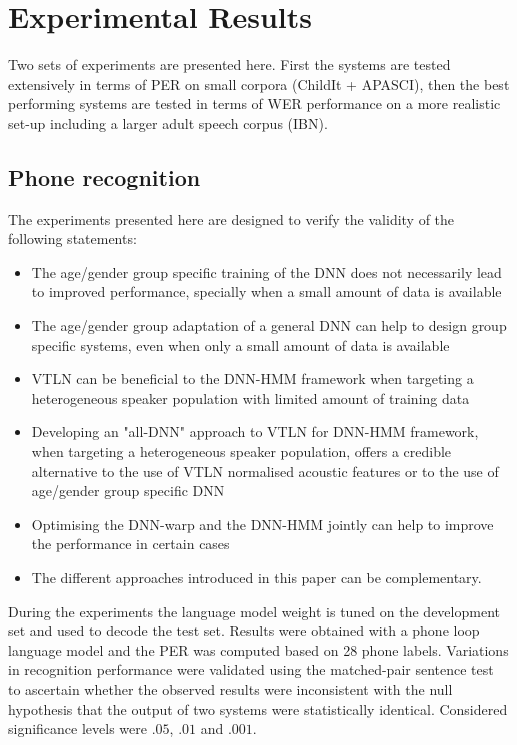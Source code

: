 \documentclass{nle}
\begin{document}
\section{Experimental Results}\label{section:expR}
Two sets of experiments are presented here. First the systems are tested extensively in terms of PER on small corpora (ChildIt + APASCI), then the best performing systems are tested in terms of WER performance on a more realistic set-up including a larger adult speech corpus (IBN).
\subsection{Phone recognition}

The experiments presented here are designed to verify the validity of the following statements:

\begin{itemize}
 \item The age/gender group specific training of the DNN does not necessarily lead to improved performance, specially when a small amount of data is available
 \item The age/gender group adaptation of a general DNN can help to design group specific systems, even when only a small amount of data is available
 \item VTLN can be beneficial to the DNN-HMM framework when targeting 
a heterogeneous speaker population with limited amount of training data
 \item Developing an "all-DNN" approach to VTLN for DNN-HMM framework, when targeting a heterogeneous speaker population, offers a credible alternative to the use of VTLN normalised acoustic features or to the use of age/gender group specific DNN
 \item Optimising the DNN-warp and the DNN-HMM jointly can help to improve the performance in certain cases
 \item The different approaches introduced in this paper can be complementary.

\end{itemize}
During the experiments the language model weight is tuned on the development set and used to decode the test set.  Results were obtained with a phone loop language model and the PER was  computed based on 28 phone labels. Variations  in recognition performance were  validated using the
matched-pair  sentence test~\citep*{GilCox89}  to ascertain  whether the
observed results  were inconsistent with the null  hypothesis that the
output  of  two  systems  were  statistically  identical.   Considered
significance levels were $.05$, $.01$ and $.001$.
\end{document}
